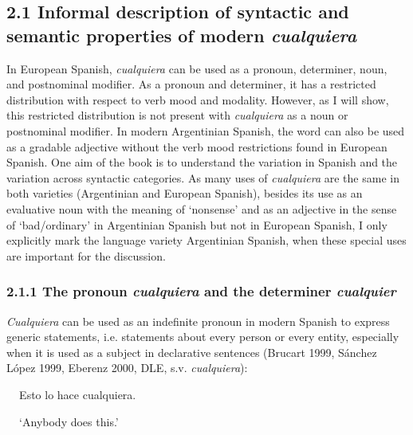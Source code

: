 \subsection[2.1 Informal description of syntactic and semantic properties of modern cualquiera]{\textbf{2.1 Informal description of syntactic and semantic properties of modern }\textbf{\textit{cualquiera}}}
\begin{styleStandard}
In European Spanish, \textit{cualquiera} can be used as a pronoun, determiner, noun, and postnominal modifier. As a pronoun and determiner, it has a restricted distribution with respect to verb mood and modality. However, as I will show, this restricted distribution is not present with \textit{cualquiera} as a noun or postnominal modifier. In modern Argentinian Spanish, the word can also be used as a gradable adjective without the verb mood restrictions found in European Spanish. One aim of the book is to understand the variation in Spanish and the variation across syntactic categories. As many uses of \textit{cualquiera} are the same in both varieties (Argentinian and European Spanish), besides its use as an evaluative noun with the meaning of ‘nonsense’ and as an adjective in the sense of ‘bad/ordinary’ in Argentinian Spanish but not in European Spanish, I only explicitly mark the language variety Argentinian Spanish, when these special uses are important for the discussion.
\end{styleStandard}

\subsubsection[2.1.1 The pronoun cualquiera and the determiner cualquier]{\textbf{2.1.1 The pronoun }\textbf{\textit{cualquiera }}\textbf{and the determiner }\textbf{\textit{cualquier}}}
\begin{styleStandard}
\textit{Cualquiera} can be used as an indefinite pronoun in modern Spanish to express generic statements, i.e. statements about every person or every entity, especially when it is used as a subject in declarative sentences (Brucart 1999, Sánchez López 1999, Eberenz 2000, DLE, s.v. \textit{cualquiera}):
\end{styleStandard}

\begin{styleStandard}
\textbf{\ \ }Esto lo hace cualquiera. 
\end{styleStandard}

\begin{styleStandard}
\textbf{\ \ }‘Anybody does this.’
\end{styleStandard}


